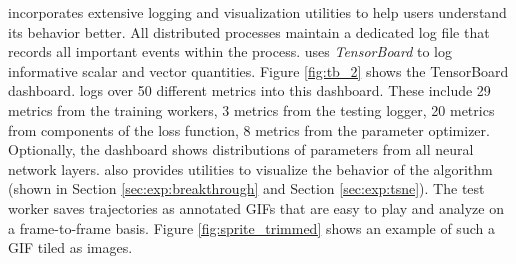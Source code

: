 \moozi incorporates extensive logging and visualization utilities to help users understand its behavior better.
All distributed processes maintain a dedicated log file that records all important events within the process.
\moozi uses \textit{TensorBoard} \cite{TensorFlowLargescaleMachine_Abadi.Agarwal.ea_2015} to log informative scalar and vector quantities.
Figure \ref{fig:tb_2} shows the \moozi TensorBoard dashboard.
\moozi logs over 50 different metrics into this dashboard.
These include 29 metrics from the training workers, 3 metrics from the testing logger, 20 metrics from components of the loss function, 8 metrics from the parameter optimizer.
Optionally, the dashboard shows distributions of parameters from all neural network layers.
\moozi also provides utilities to visualize the behavior of the algorithm (shown in Section \ref{sec:exp:breakthrough} and Section \ref{sec:exp:tsne}).
The test worker saves trajectories as annotated GIFs that are easy to play and analyze on a frame-to-frame basis.
Figure \ref{fig:sprite_trimmed} shows an example of such a GIF tiled as images.
